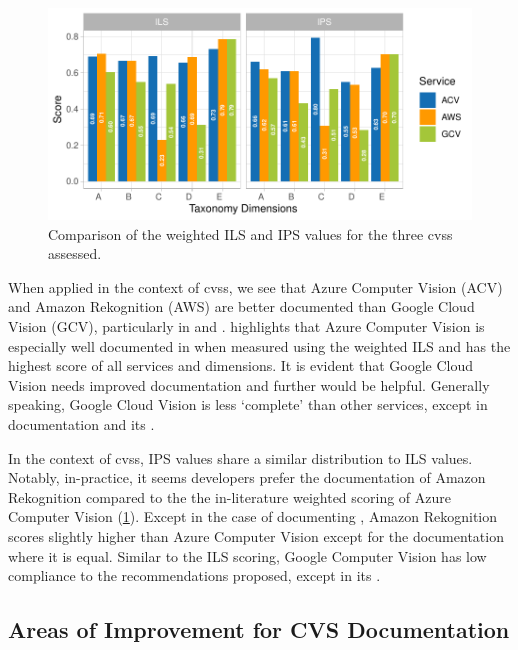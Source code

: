 \begin{figure}[tbh]
  \centering
  \includegraphics[width=\linewidth]{scores2}
  \caption[Comparison of ILS and IPS values]{Comparison of the weighted ILS and IPS values for the three \glspl{cvs} assessed.}
  \label{tse2020:fig:scorecompare}
\end{figure}

When applied in the context of \glspl{cvs}, we see that Azure Computer Vision (ACV) and Amazon Rekognition (AWS) are better documented than Google Cloud Vision (GCV), particularly in \dimb{} and \dima{}.  highlights that Azure Computer Vision is especially well documented in \dimc{} when measured using the weighted ILS and has the highest score of all services and dimensions. It is evident that Google Cloud Vision needs improved \dimb{} documentation and further \dimd{} would be helpful. Generally speaking, Google Cloud Vision is less `complete' than other services, except in \dimc{} documentation and its \dime{}.

In the context of \glspl{cvs}, IPS values share a similar distribution to ILS values. Notably, in-practice, it seems developers prefer the documentation of Amazon Rekognition compared to the the in-literature weighted scoring of Azure Computer Vision (\cref{tse2020:fig:scorecompare}). Except in the case of documenting \dimc{}, Amazon Rekognition scores slightly higher than Azure Computer Vision except for the \dimb{} documentation where it is equal. Similar to the ILS scoring, Google Computer Vision has low  compliance to the recommendations proposed, except in its \dime{}.

\subsection{Areas of Improvement for CVS Documentation}
\label{tse2020:sec:tax-analysis:cvs-improvement}


